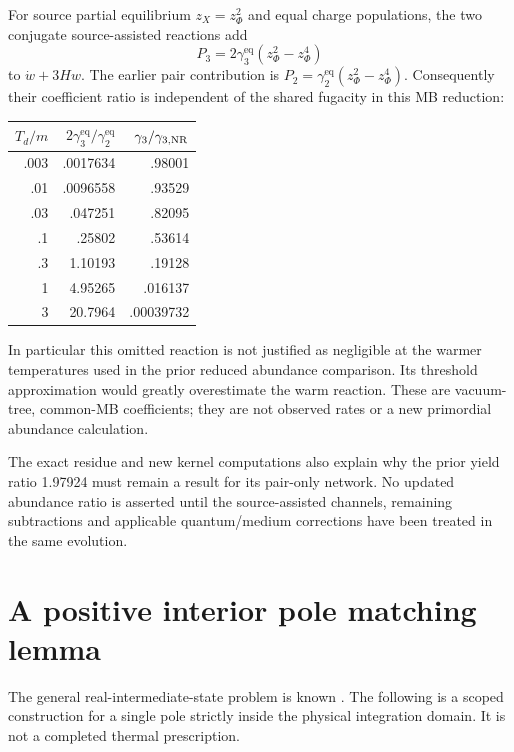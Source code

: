 \documentclass[11pt]{article}
\newcommand{\eq}{\mathrm{eq}}
\begin{document}
For source partial equilibrium $z_X=z_\Phi^2$ and equal charge populations,
the two conjugate source-assisted reactions add
\begin{equation}
 P_3=2\gamma_3^\eq(z_\Phi^2-z_\Phi^4)
\end{equation}
to $\dot w+3Hw$. The earlier pair contribution is
$P_2=\gamma_2^\eq(z_\Phi^2-z_\Phi^4)$. Consequently their coefficient
ratio is independent of the shared fugacity in this MB reduction:
\begin{center}
\begin{tabular}{r r r}
\toprule $T_d/m$ & $2\gamma_3^\eq/\gamma_2^\eq$ & $\gamma_3/\gamma_{3,\rm NR}$\\\midrule
.003 & .0017634 & .98001\\
.01 & .0096558 & .93529\\
.03 & .047251 & .82095\\
.1 & .25802 & .53614\\
.3 & 1.10193 & .19128\\
1 & 4.95265 & .016137\\
3 & 20.7964 & .00039732\\\bottomrule
\end{tabular}
\end{center}
In particular this omitted reaction is not justified as negligible at the
warmer temperatures used in the prior reduced abundance comparison. Its
threshold approximation would greatly overestimate the warm reaction.
These are vacuum-tree, common-MB coefficients; they are not observed rates
or a new primordial abundance calculation.

The exact residue and new kernel computations also explain why the prior
yield ratio 1.97924 must remain a result for its pair-only network. No
updated abundance ratio is asserted until the source-assisted channels,
remaining subtractions and applicable quantum/medium corrections have
been treated in the same evolution.

\section{A positive interior pole matching lemma}
The general real-intermediate-state problem is known \cite{SARIS}. The
following is a scoped construction for a single pole strictly inside the
physical integration domain. It is not a completed thermal prescription.
\end{document}

